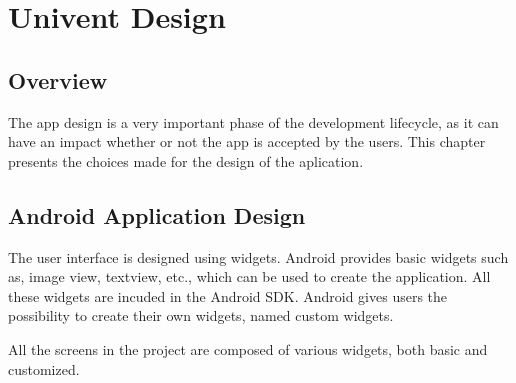\chapter{Univent Design}
\label{chap:design}
\section{Overview}

The app design is a very important phase of the development lifecycle, as it can have an impact whether or not the app is accepted by the users. This chapter presents the choices made for the design of the aplication.

\section{Android Application Design}
\label{android app design}
The user interface is designed using widgets. Android provides  basic widgets such as, image view, textview, etc., which can be used to create the application. All these widgets are incuded in the Android SDK. Android gives users the possibility to create their own widgets, named custom widgets.

All the screens in the project are composed of various widgets, both basic and customized. 

